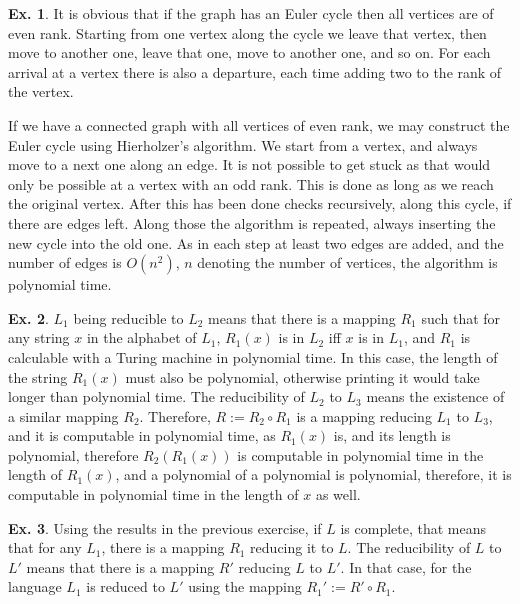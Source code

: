 \documentclass[a4paper,12pt]{article}
\theoremstyle{definition}
\newtheorem{exercise}{Ex.}[section]
\begin{document}
\begin{exercise}
 It is obvious that if the graph has an Euler cycle then all vertices are of even rank. Starting from one vertex along the cycle we leave that vertex, then move to another one, leave that one, move to another one, and so on. For each arrival at a vertex there is also a departure, each time adding two to the rank of the vertex.
 
 If we have a connected graph with all vertices of even rank, we may construct the Euler cycle using Hierholzer's algorithm. We start from a vertex, and always move to a next one along an edge. It is not possible to get stuck as that would only be possible at a vertex with an odd rank. This is done as long as we reach the original vertex. After this has been done checks recursively, along this cycle, if there are edges left. Along those the algorithm is repeated, always inserting the new cycle into the old one. As in each step at least two edges are added, and the number of edges is $O(n^2)$, $n$ denoting the number of vertices, the algorithm is polynomial time.
\end{exercise}

\begin{exercise}
 $L_1$ being reducible to $L_2$ means that there is a mapping $R_1$ such that for any string $x$ in the alphabet of $L_1$, $R_1(x)$ is in $L_2$ iff $x$ is in $L_1$, and $R_1$ is calculable with a Turing machine in polynomial time. In this case, the length of the string $R_1(x)$ must also be polynomial, otherwise printing it would take longer than polynomial time. The reducibility of  $L_2$ to $L_3$ means the existence of a similar mapping $R_2$. Therefore, $R := R_2 \circ R_1$ is a mapping reducing $L_1$ to $L_3$, and it is computable in polynomial time, as $R_1(x)$ is, and its length is polynomial, therefore $R_2(R_1(x))$ is computable in polynomial time in the length of $R_1(x)$, and a polynomial of a polynomial is polynomial, therefore, it is computable in polynomial time in the length of $x$ as well.
\end{exercise}

\begin{exercise}
 Using the results in the previous exercise, if $L$ is complete, that means that for any $L_1$, there is a mapping $R_1$ reducing it to $L$. The reducibility of $L$ to $L'$ means that there is a mapping $R'$ reducing $L$ to $L'$. In that case, for the language $L_1$ is reduced to $L'$ using the mapping $R_1' := R' \circ R_1$.
\end{exercise}
\end{document}
